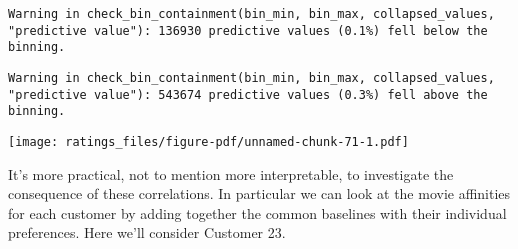 \documentclass[
  letterpaper,
  DIV=11,
  numbers=noendperiod]{scrartcl}
\begin{document}
\begin{verbatim}
Warning in check_bin_containment(bin_min, bin_max, collapsed_values,
"predictive value"): 136930 predictive values (0.1%) fell below the binning.
\end{verbatim}

\begin{verbatim}
Warning in check_bin_containment(bin_min, bin_max, collapsed_values,
"predictive value"): 543674 predictive values (0.3%) fell above the binning.
\end{verbatim}

\texttt{[image: ratings\_files/figure-pdf/unnamed-chunk-71-1.pdf]}

It's more practical, not to mention more interpretable, to investigate
the consequence of these correlations. In particular we can look at the
movie affinities for each customer by adding together the common
baselines with their individual preferences. Here we'll consider
Customer 23.
\end{document}

